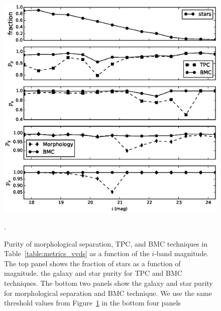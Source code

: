 \documentclass[useAMS,usenatbib]{mn2e}
\begin{document}
\begin{figure}
  \begin{minipage}[t]{0.49\linewidth}
    \includegraphics[width=\textwidth]{figures/purity_mag.eps}
    \caption{Purity of morphological separation,
             TPC, and BMC techniques in 
             Table~\ref{table:metrics_vvds}
             as a function of the $i$-band magnitude.
             The top panel shows the fraction of stars
             as a function of magnitude.
             the galaxy and star purity for TPC and BMC techniques.
             The bottom two panels show
             the galaxy and star purity for morphological separation
             and BMC technique.
             We use the same threshold values from 
             Figure~\ref{fig:purity_mag} in the bottom four panels}.
    \label{fig:purity_mag}
  \end{minipage}
  \hfill
  \begin{minipage}[t]{0.49\linewidth}

\end{minipage}
\end{figure}
\end{document}
